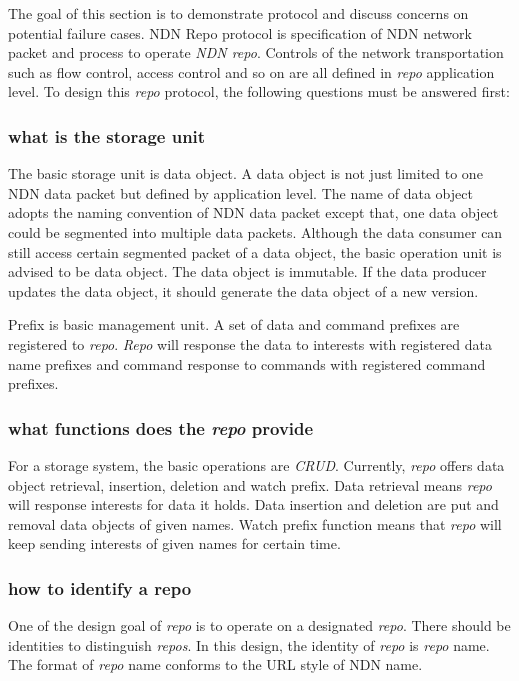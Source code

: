 \documentclass[conference]{IEEEtran}
\begin{document}
The goal of this section is to demonstrate protocol and discuss concerns on potential failure cases. NDN Repo protocol is specification of NDN network packet and process to operate \emph{NDN repo}. Controls of the network transportation such as flow control, access control and so on are all defined in \emph{repo} application level. To design this \emph{repo} protocol, the following questions must be answered first:

\subsubsection{what is the storage unit}

The basic storage unit is data object. A data object is not just limited to one NDN data packet but defined by application level. The name of data object adopts the naming convention of NDN data packet except that, one data object could be segmented into multiple data packets. Although the data consumer can still access certain segmented packet of a data object, the basic operation unit is advised to be data object. The data object is immutable. If the data producer updates the data object, it should generate the data object of a new version.

Prefix is basic management unit. A set of data and command prefixes are registered to \emph{repo}. \emph{Repo} will response the data to interests with registered data name prefixes and command response to commands with registered command prefixes.

\subsubsection{what functions does the \emph{repo} provide}

For a storage system, the basic operations are \emph{CRUD}. Currently, \emph{repo} offers data object retrieval, insertion, deletion and watch prefix. Data retrieval means \emph{repo} will response interests for data it holds. Data insertion and deletion are put and removal data objects of given names. Watch prefix function means that \emph{repo} will keep sending interests of given names for certain time.

\subsubsection{how to identify a repo}

One of the design goal of \emph{repo} is to operate on a designated \emph{repo}. There should be identities to distinguish \emph{repos}. In this design, the identity of \emph{repo} is \emph{repo} name. The format of \emph{repo} name conforms to the URL style of NDN name.
\end{document}
